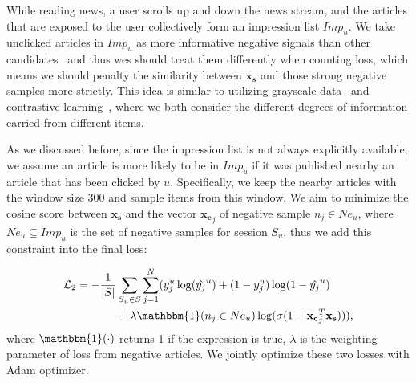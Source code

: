 While reading news, a user scrolls up and down the news stream, 
and the articles that are exposed to the user collectively 
form an impression list $Imp_u$. We take unclicked articles in $Imp_u$ as more informative negative signals than other candidates~\cite{xie2020deep} and thus wes should treat them differently when counting loss, which means we should penalty the similarity between $\mathbf{x_s}$ and those strong negative samples more strictly. This idea is similar to utilizing grayscale data~\cite{lin2020world} and contrastive learning~\cite{saunshi2019theoretical}, where we both consider the different degrees of information carried from different items.

As we discussed before, since the impression list is not always explicitly available, 
we assume an article is more likely to be in $Imp_u$ if it was published nearby an article that has
been clicked by $u$. Specifically, we keep the nearby articles with the window size 300 and sample items from this window.
We aim to minimize the cosine score between $\mathbf{x_s}$ and the vector $\mathbf{x_{c}}_j$ of negative sample 
$n_j\in Ne_u$, where $Ne_u\subseteq Imp_u$ is the set of negative samples for session $S_u$, thus we add this constraint into the final loss: 

\begin{equation}
    \label{eq:loss}
    \begin{split}
        \mathcal{L}_2 = - \frac{1}{|S|} & \sum_{S_u \in S}\sum_{j=1}^N ( y_j^u \log(\hat{y_j}^u) + (1-y_j^u)\log(1-\hat{y_j}^u) \\
        & +  \lambda \mathbbm{1}(n_j \in Ne_u) \log(\sigma(1-\mathbf{x_{c}}_j^T\mathbf{x_s}))),
    \end{split}
\end{equation}
where $\mathbbm{1}(\cdot)$ returns 1 if the expression is true, $\lambda$ is 
the weighting parameter of loss from negative articles. We jointly optimize these two losses 
with Adam optimizer. 